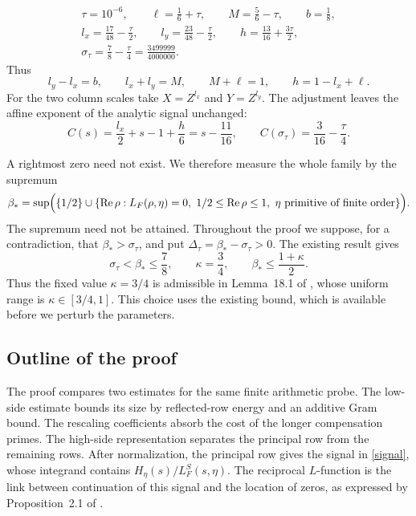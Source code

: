 \documentclass[10pt,reqno,a4paper]{amsart}
\theoremstyle{remark}
\newcommand{\Rea}{\operatorname{Re}}
\newcommand{\st}{\sigma_\tau}
\newcommand{\bp}{\beta_*}
\begin{document}
\begin{equation}\label{parameters}
\begin{gathered}
 \tau=10^{-6},\qquad \ell=\frac16+\tau,
 \qquad M=\frac56-\tau,\qquad b=\frac18,\\
 l_x=\frac{17}{48}-\frac\tau2,
 \qquad l_y=\frac{23}{48}-\frac\tau2,
 \qquad h=\frac{13}{16}+\frac{3\tau}{2},\\
 \st=\frac78-\frac\tau4=\frac{3499999}{4000000}.
\end{gathered}
\end{equation}
Thus
\[
 l_y-l_x=b,\qquad l_x+l_y=M,\qquad M+\ell=1,
 \qquad h=1-l_x+\ell.
\]
For the two column scales take $X=Z^{l_x}$ and $Y=Z^{l_y}$.
The adjustment leaves the affine exponent of the analytic signal
unchanged:
\begin{equation}\label{signal-exponent}
 C(s)=\frac{l_x}{2}+s-1+\frac h6=s-\frac{11}{16},
 \qquad C(\st)=\frac3{16}-\frac\tau4.
\end{equation}

A rightmost zero need not exist. We therefore measure the whole family
by the supremum
\[
 \bp=\sup\Bigl(\{1/2\}\cup
 \{\Rea\rho:L_F(\rho,\eta)=0,\ 1/2\le\Rea\rho\le1,
       \ \eta\text{ primitive of finite order}\}\Bigr).
\]
The supremum need not be attained. Throughout the proof we suppose, for
a contradiction, that $\bp>\st$, and put
$\Delta_\tau=\bp-\st>0$. The existing result gives
\begin{equation}\label{beta-range}
 \st<\bp\le\frac78,\qquad \kappa=\frac34,
 \qquad \bp\le\frac{1+\kappa}{2}.
\end{equation}
Thus the fixed value $\kappa=3/4$ is admissible in Lemma~18.1 of
\cite{q30}, whose uniform range is $\kappa\in[3/4,1]$. This choice uses
the existing bound, which is available before we perturb the parameters.

\subsection{Outline of the proof}

The proof compares two estimates for the same finite arithmetic probe.
The low-side estimate bounds its size by reflected-row energy and an
additive Gram bound. The rescaling coefficients absorb the cost of the
longer compensation primes. The high-side representation separates the
principal row from the remaining rows. After normalization, the principal
row gives the signal in \eqref{signal}, whose integrand contains
$H_\eta(s)/L_F^S(s,\eta)$. The reciprocal $L$-function is the link
between continuation of this signal and the location of zeros, as expressed
by Proposition~2.1 of \cite{q30}.
\end{document}
